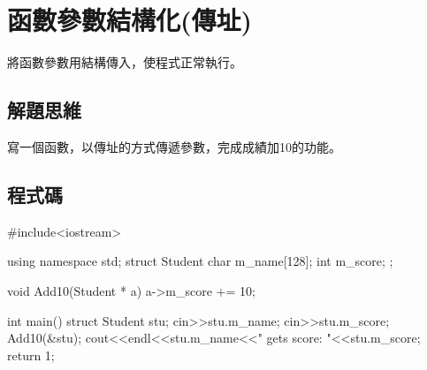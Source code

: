 \section{函數參數結構化(傳址)}
將函數參數用結構傳入，使程式正常執行。
\subsection{解題思維}

寫一個函數，以傳址的方式傳遞參數，完成成績加10的功能。

\subsection{程式碼}
\begin{cppcode}
	#include<iostream>
	
	using namespace std;
	struct Student {
		char m_name[128];
		int m_score;
	};
	
	void Add10(Student * a)
	{
		a->m_score += 10;
	}
	
	int main()
	{
		struct Student stu;
		cin>>stu.m_name;
		cin>>stu.m_score;
		Add10(&stu);
		cout<<endl<<stu.m_name<<" gets score: "<<stu.m_score;
		return 1;
	}
\end{cppcode}